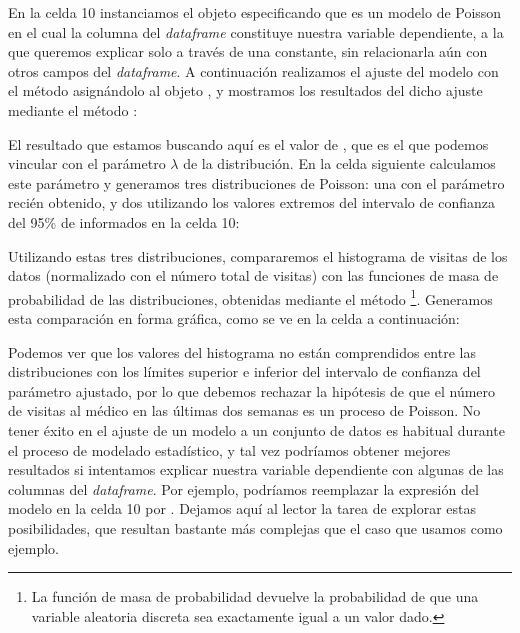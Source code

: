 
En la celda 10 instanciamos el objeto  especificando que es un modelo de Poisson en el cual la columna  del \textit{dataframe} constituye nuestra variable dependiente, a la que queremos explicar solo a través de una constante, sin relacionarla aún con otros campos del \textit{dataframe}. A continuación realizamos el ajuste del modelo con el método  asignándolo al objeto , y mostramos los resultados del dicho ajuste mediante el método :


El resultado que estamos buscando aquí es el valor de , que es el que podemos vincular con el parámetro $\lambda$ de la distribución. En la celda siguiente calculamos este parámetro y generamos tres distribuciones de Poisson: una con el parámetro recién obtenido, y dos utilizando los valores extremos del intervalo de confianza del 95\% de  informados en la celda 10:


Utilizando estas tres distribuciones, compararemos el histograma de visitas de los datos (normalizado con el número total de visitas) con las funciones de masa de probabilidad de las distribuciones, obtenidas mediante el método \footnote{La función de masa de probabilidad devuelve la probabilidad de que una variable aleatoria discreta sea exactamente igual a un valor dado.}. Generamos esta comparación en forma gráfica, como se ve en la celda a continuación:


Podemos ver que los valores del histograma no están comprendidos entre las distribuciones con los límites superior e inferior del intervalo de confianza del parámetro ajustado, por lo que debemos rechazar la hipótesis de que el número de visitas al médico en las últimas dos semanas es un proceso de Poisson. No tener éxito en el ajuste de un modelo a un conjunto de datos es habitual durante el proceso de modelado estadístico, y tal vez podríamos obtener mejores resultados si intentamos explicar nuestra variable dependiente con algunas de las columnas del \textit{dataframe}. Por ejemplo, podríamos reemplazar la expresión del modelo en la celda 10 por . Dejamos aquí al lector la tarea de explorar estas posibilidades, que resultan bastante más complejas que el caso que usamos como ejemplo.


